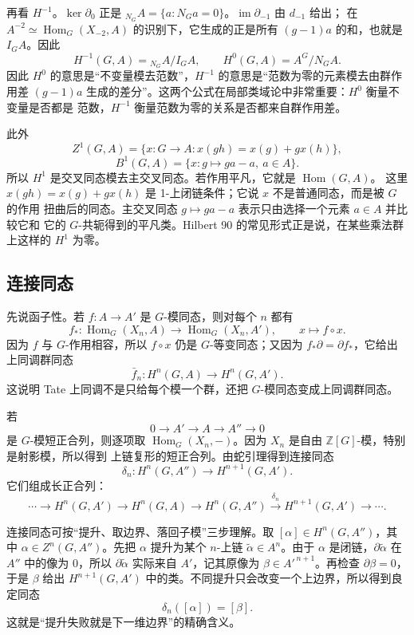 \documentclass[11pt,a4paper,openany]{ctexbook}
\numberwithin{equation}{chapter}
\newcommand{\Z}{\mathbb{Z}}
\theoremstyle{plain}
\theoremstyle{definition}
\theoremstyle{remark}
\begin{document}
再看 $H^{-1}$。$\ker\partial_0$ 正是
${}_{N_G}A=\{a:N_Ga=0\}$。$\operatorname{im}\partial_{-1}$ 由 $d_{-1}$ 给出；
在 $A^{-2}\simeq\operatorname{Hom}_G(X_{-2},A)$ 的识别下，它生成的正是所有
$(g-1)a$ 的和，也就是 $I_GA$。因此
\[
 H^{-1}(G,A)={}_{N_G}A/I_GA,
\qquad
 H^0(G,A)=A^G/N_GA.
\]
因此 $H^0$ 的意思是“不变量模去范数”，$H^{-1}$ 的意思是“范数为零的元素模去由群作用差
$(g-1)a$ 生成的差分”。这两个公式在局部类域论中非常重要：$H^0$ 衡量不变量是否都是
范数，$H^{-1}$ 衡量范数为零的关系是否都来自群作用差。

此外
\[
 Z^1(G,A)=\{x:G\to A:x(gh)=x(g)+gx(h)\},
\]
\[
 B^1(G,A)=\{x:g\mapsto ga-a,\ a\in A\}.
\]
所以 $H^1$ 是交叉同态模去主交叉同态。若作用平凡，它就是 $\operatorname{Hom}(G,A)$。
这里 $x(gh)=x(g)+gx(h)$ 是 1-上闭链条件；它说 $x$ 不是普通同态，而是被 $G$ 的作用
扭曲后的同态。主交叉同态 $g\mapsto ga-a$ 表示只由选择一个元素 $a\in A$ 并比较它和
它的 $G$-共轭得到的平凡类。Hilbert 90 的常见形式正是说，在某些乘法群上这样的
$H^1$ 为零。

\subsection{连接同态}

先说函子性。若 $f:A\to A'$ 是 $G$-模同态，则对每个 $n$ 都有
\[
f_*:\operatorname{Hom}_G(X_n,A)\longrightarrow \operatorname{Hom}_G(X_n,A'),
\qquad x\longmapsto f\circ x.
\]
因为 $f$ 与 $G$-作用相容，所以 $f\circ x$ 仍是 $G$-等变同态；又因为
$f_*\partial=\partial f_*$，它给出上同调群同态
\[
\bar f_n:H^n(G,A)\longrightarrow H^n(G,A').
\]
这说明 Tate 上同调不是只给每个模一个群，还把 $G$-模同态变成上同调群同态。

若
\[
 0\to A'\to A\to A''\to0
\]
是 $G$-模短正合列，则逐项取
$\operatorname{Hom}_G(X_n,-)$。因为 $X_n$ 是自由 $\Z[G]$-模，特别是射影模，所以得到
上链复形的短正合列。由蛇引理得到连接同态
\[
 \delta_n:H^n(G,A'')\to H^{n+1}(G,A').
\]
它们组成长正合列：
\[
\cdots\to H^n(G,A')\to H^n(G,A)\to H^n(G,A'')
\xrightarrow{\delta_n}H^{n+1}(G,A')\to\cdots.
\]

连接同态可按“提升、取边界、落回子模”三步理解。取 $[\alpha]\in H^n(G,A'')$，其中
$\alpha\in Z^n(G,A'')$。先把 $\alpha$ 提升为某个 $n$-上链
$\widetilde\alpha\in A^n$。由于 $\alpha$ 是闭链，$\partial\widetilde\alpha$ 在
$A''$ 中的像为 $0$，所以 $\partial\widetilde\alpha$ 实际来自 $A'$，记其原像为
$\beta\in A'^{\,n+1}$。再检查 $\partial\beta=0$，于是 $\beta$ 给出
$H^{n+1}(G,A')$ 中的类。不同提升只会改变一个上边界，所以得到良定同态
\[
\delta_n([\alpha])=[\beta].
\]
这就是“提升失败就是下一维边界”的精确含义。
\end{document}
